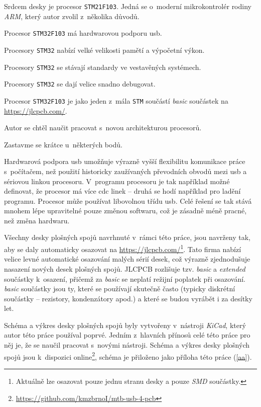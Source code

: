 Srdcem desky je procesor \texttt{STM21F103}. Jedná se o~moderní mikrokontrolér
rodiny \textit{ARM}, který autor zvolil z~několika důvodů.

\begin{compactenum}
\item Procesor \texttt{STM32F103} má hardwarovou podporu \gls{usb}.
\item Procesory \texttt{STM32} nabízí velké velikosti pamětí a výpočetní výkon.
\item Procesory \texttt{STM32} se stávají standardy ve vestavěných systémech.
\item Procesory \texttt{STM32} se dají velice snadno debugovat.
\item Procesor \texttt{STM32F103} je jako jeden z~mála \texttt{STM} součástí
	\textit{basic} součástek na \url{https://jlcpcb.com/}.
\item Autor se chtěl naučit pracovat s~novou architekturou procesorů.
\end{compactenum}

Zastavme se krátce u~některých bodů.

Hardwarová podpora \gls{usb} umožňuje výrazně vyšší flexibilitu komunikace
práce s~počítačem, než použití historicky zaužívaných převodních obvodů mezi
\gls{usb} a sériovou linkou procesoru. V~programu procesoru je tak například
možné definovat, že procesor má více \gls{cdc} linek – druhá se hodí například
pro ladění programu. Procesor může používat libovolnou třídu \gls{usb}. Celé
řešení se tak stává mnohem lépe upravitelné pouze změnou softwaru, což je
zásadně méně pracné, než změna hardwaru.

Všechny desky plošných spojů navrhnuté v~rámci této práce, jsou navrženy tak,
aby se daly automaticky osazovat na \url{https://jlcpcb.com/}\footnote{Aktuálně
lze osazovat pouze jednu stranu desky a pouze \textit{SMD} součástky.}. Tato
firma nabízí velice levné automatické osazování malých sérií desek, což výrazně
zjednodušuje nasazení nových desek plošných spojů. JLCPCB rozlišuje tzv.
\textit{basic} a \textit{extended} součástky k~osazení, přičemž za
\textit{basic} se neplatí režijní poplatek při osazování. \textit{basic}
součástky jsou ty, které se používají skutečně často (typicky diskrétní
součástky – rezistory, kondenzátory apod.) a které se budou vyrábět i za
desítky let.

Schéma a výkres desky plošných spojů byly vytvořeny v~nástroji \textit{KiCad},
který autor této práce používal poprvé. Jedním z~hlavních přínosů celé této
práce pro něj je, že se naučil pracovat s~novými nástroji. Schéma a výkres
desky plošných spojů jsou k~dispozici
online\footnote{\url{https://github.com/kmzbrnoI/mtb-usb-4-pcb}}, schéma je
přiloženo jako příloha této práce (\ref{aa}).

